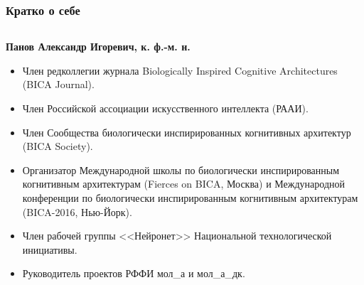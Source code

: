 \documentclass[default]{beamer}
\begin{document}
	\begin{frame}
		\frametitle{Кратко о себе}
		\scriptsize
		\begin{columns}
			\begin{column}{0.85\textwidth}
				\textbf{Панов Александр Игоревич, к. ф.-м. н.}
				\begin{itemize}
					\item Член редколлегии журнала Biologically Inspired Cognitive Architectures (BICA Journal).
					\item Член Российской ассоциации искусственного интеллекта (РААИ).
					\item Член Сообщества биологически инспирированных когнитивных архитектур (BICA Society).
					\item Организатор Международной	школы по биологически инспирированным когнитивным архитектурам (Fierces on BICA, Москва) и Международной конференции по биологически инспирированным когнитивным архитектурам (BICA-2016, Нью-Йорк).
					\item Член рабочей группы <<Нейронет>> Национальной технологической инициативы.
					\item Руководитель проектов РФФИ мол\_а и мол\_а\_дк.
				\end{itemize}
			\end{column}
			

\end{columns}
\end{frame}
\end{document}
